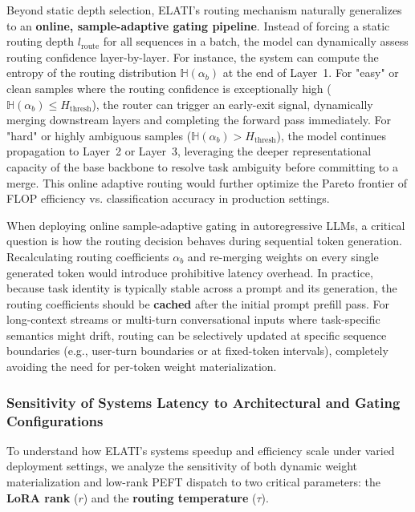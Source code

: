 Beyond static depth selection, ELATI's routing mechanism naturally generalizes to an \textbf{online, sample-adaptive gating pipeline}. Instead of forcing a static routing depth $l_{\text{route}}$ for all sequences in a batch, the model can dynamically assess routing confidence layer-by-layer. For instance, the system can compute the entropy of the routing distribution $\mathbb{H}(\alpha_{b})$ at the end of Layer~1. For "easy" or clean samples where the routing confidence is exceptionally high ($\mathbb{H}(\alpha_{b}) \le H_{\text{thresh}}$), the router can trigger an early-exit signal, dynamically merging downstream layers and completing the forward pass immediately. For "hard" or highly ambiguous samples ($\mathbb{H}(\alpha_{b}) > H_{\text{thresh}}$), the model continues propagation to Layer~2 or Layer~3, leveraging the deeper representational capacity of the base backbone to resolve task ambiguity before committing to a merge. This online adaptive routing would further optimize the Pareto frontier of FLOP efficiency vs. classification accuracy in production settings.

When deploying online sample-adaptive gating in autoregressive LLMs, a critical question is how the routing decision behaves during sequential token generation. Recalculating routing coefficients $\alpha_b$ and re-merging weights on every single generated token would introduce prohibitive latency overhead. In practice, because task identity is typically stable across a prompt and its generation, the routing coefficients should be \textbf{cached} after the initial prompt prefill pass. For long-context streams or multi-turn conversational inputs where task-specific semantics might drift, routing can be selectively updated at specific sequence boundaries (e.g., user-turn boundaries or at fixed-token intervals), completely avoiding the need for per-token weight materialization.

\subsubsection{Sensitivity of Systems Latency to Architectural and Gating Configurations}
\label{subsec:sensitivity_analysis}
To understand how ELATI's systems speedup and efficiency scale under varied deployment settings, we analyze the sensitivity of both dynamic weight materialization and low-rank PEFT dispatch to two critical parameters: the \textbf{LoRA rank} ($r$) and the \textbf{routing temperature} ($\tau$).

